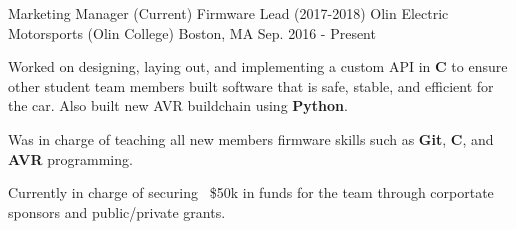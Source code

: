 \begin{cventries}
  \cventry
    {Marketing Manager (Current) Firmware Lead (2017-2018)} %
    {Olin Electric Motorsports (Olin College)} %
    {Boston, MA} %
    {Sep. 2016 - Present} %
    {
      \begin{cvitems} %
        \item Worked on designing, laying out, and implementing a custom API in \textbf{C} to ensure other student team members built software that is safe, stable, and efficient for the car. Also built new AVR buildchain using \textbf{Python}.
        \item Was in charge of teaching all new members firmware skills such as \textbf{Git}, \textbf{C}, and \textbf{AVR} programming.
        \item Currently in charge of securing ~\$50k in funds for the team through corportate sponsors and public/private grants.
      \end{cvitems}
    }

\end{cventries}
